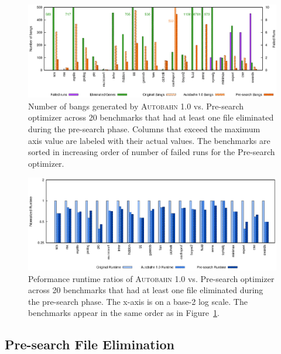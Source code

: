\documentclass[format=sigplan, review=true]{acmart}
\newcommand{\figref}[1]{Figure~\ref{#1}}
\newcommand{\Ao}[0]{\textsc{Autobahn 1.0}}
\newcommand{\preopt}[0]{pre-search}
\newcommand{\Preopt}[0]{Pre-search}
\begin{document}
\begin{figure}
\includegraphics[width=\textwidth]{pre-aut-bangs}
\caption{Number of bangs generated by \Ao{} vs. \Preopt{} optimizer across 20 benchmarks that had at least
one file eliminated during the \preopt{} phase. Columns that exceed
the maximum axis value are labeled with their actual values. The
benchmarks are sorted in increasing order of number of failed runs for
the \Preopt{} optimizer.}
\label{fig:preopt-bangs}
\end{figure}

\begin{figure}
\includegraphics[width=\textwidth]{pre-aut}
\caption{Peformance runtime ratios of \Ao{} vs. \Preopt{} optimizer
across 20 benchmarks that had at least one
file eliminated during the \preopt{} phase. The x-axis 
is on a base-2 log scale. The benchmarks appear in the same order as
in \figref{fig:preopt-bangs}.}
\label{fig:preopt-runtime}
\end{figure}

\subsection{\Preopt{} File Elimination}
\label{sec:file-elim}
\end{document}
